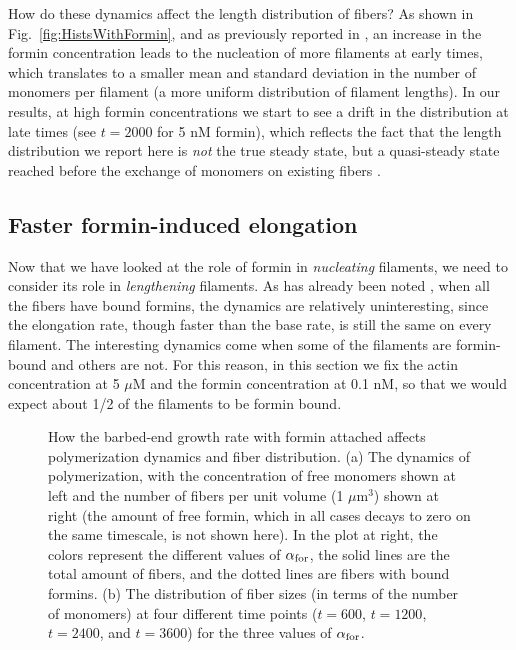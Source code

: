\documentclass[11pt]{article}
\begin{document}
How do these dynamics affect the length distribution of fibers? As shown in Fig.\ \ref{fig:HistsWithFormin}, and as previously reported in \cite{banerjee2022emergence}, an increase in the formin concentration leads to the nucleation of more filaments at early times, which translates to a smaller mean and standard deviation in the number of monomers per filament (a more uniform distribution of filament lengths). In our results, at high formin concentrations we start to see a drift in the distribution at late times (see $t=2000$ for 5 nM formin), which reflects the fact that the length distribution we report here is \emph{not} the true steady state, but a quasi-steady state reached before the exchange of monomers on existing fibers \cite{mohapatra2017limiting}.

\subsection{Faster formin-induced elongation}
Now that we have looked at the role of formin in \emph{nucleating} filaments, we need to consider its role in \emph{lengthening} filaments. As has already been noted \cite{banerjee2022emergence}, when all the fibers have bound formins, the dynamics are relatively uninteresting, since the elongation rate, though faster than the base rate, is still the same on every filament. The interesting dynamics come when some of the filaments are formin-bound and others are not. For this reason, in this section we fix the actin concentration at 5 $\mu$M and the formin concentration at 0.1 nM, so that we would expect about 1/2 of the filaments to be formin bound. 

\begin{figure}
\centering
{}
\caption{\label{fig:ForminAlpha}How the barbed-end growth rate with formin attached affects polymerization dynamics and fiber distribution. (a) The dynamics of polymerization, with the concentration of free monomers shown at left and the number of fibers per unit volume (1 $\mu$m$^3$) shown at right (the amount of free formin, which in all cases decays to zero on the same timescale, is not shown here). In the plot at right, the colors represent the different values of $\alpha_\text{for}$, the solid lines are the total amount of fibers, and the dotted lines are fibers with bound formins. (b) The distribution of fiber sizes (in terms of the number of monomers) at four different time points ($t=600$, $t=1200$, $t=2400$, and $t=3600$) for the three values of $\alpha_\text{for}$.}
\end{figure}
\end{document}
